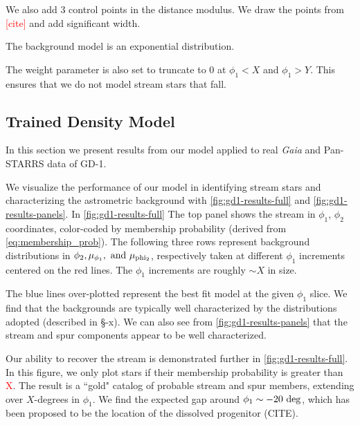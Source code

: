 \documentclass[twocolumn]{aastex631}
\newcommand{\TODO}[1]{{\textcolor{red}{#1}}}
\newcommand{\JN}[1]{\TODO{#1}}
\begin{document}
{        We also add 3 control points in the distance modulus.
        We draw the points from \TODO{[cite]} and add significant width.

        The background model is an exponential distribution.
        

        The weight parameter is also set to truncate to $0$ at $\phi_1 < X$
        and $\phi_1 > Y$. This ensures that we do not model stream stars that fall.


    \subsection{Trained Density Model}\label{sub:results_gd1:results}
    
        In this section we present results from our model applied to real {\it
        Gaia} and Pan-STARRS data of GD-1. 

        We visualize the performance of our model in identifying stream stars
        and characterizing the astrometric background with
        \autoref{fig:gd1-results-full} and \autoref{fig:gd1-results-panels}. In
        \autoref{fig:gd1-results-full} The top panel shows the stream in
        $\phi_1$, $\phi_2$ coordinates, color-coded by membership probability
        (derived from \autoref{eq:membership_prob}). The following three rows
        represent background distributions in $\phi_2, \mu_{\phi_1}, \rm{\ and}
        \ \mu_{\rm phi_2}$, respectively taken at different $\phi_1$ increments
        centered on the red lines. The $\phi_1$ increments are roughly $\sim X$
        in size.

        The blue lines over-plotted represent the best fit model at the given
        $\phi_1$ slice. We find that the backgrounds are typically well
        characterized by the distributions adopted (described in \S-x). We can
        also see from \autoref{fig:gd1-results-panels} that the stream and spur
        components appear to be well characterized. 
        
        Our ability to recover the stream is demonstrated further in
        \autoref{fig:gd1-results-full}. In this figure, we only plot stars if
        their membership probability is greater than \JN{X}. The result is a
        ``gold" catalog of probable stream and spur members, extending over
        $X$-degrees in $\phi_1$. We find the expected gap around $\phi_1 \sim
        -20~\rm{deg}$, which has been proposed to be the location of the
        dissolved progenitor (CITE).

}
\end{document}
